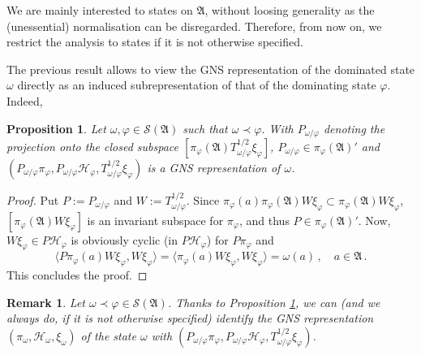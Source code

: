 \documentclass[12pt]{amsart}
\numberwithin{equation}{section}
\def\ch{{\mathcal H}}
\def\cs{{\mathcal S}}
\def\ga{{\mathfrak A}} \def\gpa{{\mathfrak a}}
\def\f{\varphi}\def\ff{\phi} \def\F{\Phi}
\def\om{\omega} \def\Om{\Omega}
\newtheorem{prop}[thm]{Proposition}
\newtheorem{rem}[thm]{Remark}
\begin{document}
We are mainly interested to states on $\ga$, without loosing generality as the (unessential) normalisation can be disregarded. Therefore, from now on, we restrict the analysis to states if it is not otherwise specified.

The previous result allows to view the GNS representation of the dominated state $\om$ directly as an induced subrepresentation of that of the dominating state $\f$. Indeed,
\begin{prop}
\label{pi}
Let $\omega,\varphi\in\cs(\ga)$ such that $\omega\prec\varphi$. With $P_{\om/\f}$ denoting the projection onto the closed subspace $[\pi_\f(\ga)T^{1/2}_{\om/\f}\xi_\f]$, $P_{\om/\f}\in\pi_\f(\ga)'$ and 
$(P_{\om/\f}\pi_\f,  P_{\om/\f}\ch_\f, T^{1/2}_{\om/\f}\xi_\f)$ is a GNS representation of $\om$.
\end{prop}
\begin{proof}
Put $P:=P_{\om/\f}$ and $W:=T^{1/2}_{\om/\f}$. Since $\pi_\f(a)\pi_\f(\ga)W\xi_\f\subset\pi_\f(\ga)W\xi_\f$, $[\pi_\f(\ga)W\xi_\f]$ is an invariant subspace for $\pi_\f$, and thus $P\in\pi_\f(\ga)'$. Now, $W\xi_\f\in P\ch_\f$ is obviously cyclic (in $P\ch_\f$) for 
$P\pi_\f$ and
$$
\langle P\pi_\f(a)W\xi_\f,W\xi_\f\rangle=\langle\pi_\f(a)W\xi_\f,W\xi_\f\rangle=\om(a)\,,\quad a\in\ga\,.
$$
This concludes the proof.
\end{proof}
\begin{rem}
Let $\om\prec\f\in\cs(\ga)$. Thanks to Proposition \ref{pi}, we can (and we always do, if it is not otherwise specified) identify the GNS representation $(\pi_\om,\ch_\om,\xi_\om)$ of the state 
$\om$ with
$(P_{\om/\f}\pi_\f,P_{\om/\f}\ch_\f, T^{1/2}_{\om/\f}\xi_\f)$.
\end{rem}
\end{document}

